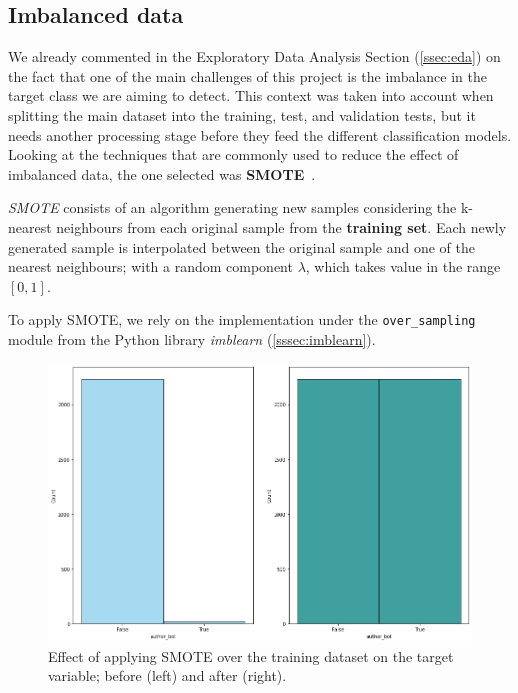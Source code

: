 \documentclass[a4paper, 12pt]{book}
\begin{document}
\subsection{Imbalanced data}
\label{ssec:imbalanced-data}


We already commented in the Exploratory Data Analysis Section (\ref{ssec:eda}) on the fact that one of the main challenges of this project is the imbalance in the target class we are aiming to detect. This context was taken into account when splitting the main dataset into the training, test, and validation tests, but it needs another processing stage before they feed the different classification models. Looking at the techniques that are commonly used to reduce the effect of imbalanced data, the one selected was \textbf{SMOTE}~\cite{chawla2002smote}. 

\textit{SMOTE} consists of an algorithm generating new samples considering the k-nearest neighbours from each original sample from the \textbf{training set}. Each newly generated sample is interpolated between the original sample and one of the nearest neighbours; with a random component $\lambda$, which takes value in the range $[0, 1]$.

To apply SMOTE, we rely on the implementation under the \texttt{over\_sampling} module from the Python library \textit{imblearn} (\ref{sssec:imblearn}).

\begin{figure}
 \centering
  \includegraphics[width=17cm, keepaspectratio]{img/author_bot_SMOTE_train.png}
  \caption{Effect of applying SMOTE over the training dataset on the target variable; before (left) and after (right).}
  \label{fig:smote-train}
\end{figure}
\end{document}
